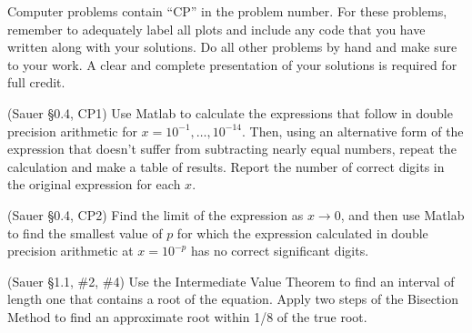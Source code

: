 \documentclass[12pt,fleqn]{exam}
\begin{document}
Computer problems contain ``CP'' in the problem number. For these problems, remember to adequately label all plots and include any code that you have written along with your solutions. Do all other problems by hand and make sure to your work. A clear and complete presentation of your solutions is required for full credit.

\begin{questions}

\question (Sauer \S0.4, CP1) Use Matlab to calculate the expressions that follow in double precision arithmetic for $x = 10^{-1}, \dots, 10^{-14}$. Then, using an alternative form of the expression that doesn't suffer from subtracting nearly equal numbers, repeat the calculation and make a table of results. Report the number of correct digits in the original expression for each $x$.


\question (Sauer \S0.4, CP2) Find the limit of the expression as $x \rightarrow 0$, and then use Matlab to find the smallest value of $p$ for which the expression calculated in double precision arithmetic at $x = 10^{-p}$ has no correct significant digits.


\question (Sauer \S1.1, \#2, \#4) Use the Intermediate Value Theorem to find an interval of length one that contains a root of the equation. Apply two steps of the Bisection Method to find an approximate root within 1/8 of the true root.


\end{questions}
\end{document}
